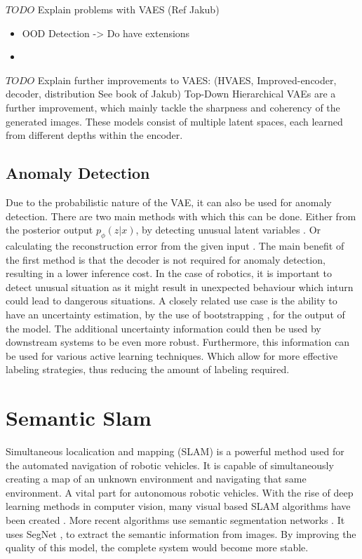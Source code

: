 $TODO$ Explain problems with VAES (Ref Jakub)
\begin{itemize}
    \item OOD Detection -> Do have extensions
    \item
\end{itemize}
$TODO$ Explain further improvements to VAES: (HVAES, Improved-{encoder, decoder, distribution} See book of Jakub)
Top-Down Hierarchical VAEs \cite{maaloe2019biva,NIPS2016_6ae07dcb,vahdat2020nvae} are a further improvement, which mainly tackle the sharpness and coherency of the generated images. These models consist of multiple latent spaces, each learned from different depths within the encoder.


\subsection{Anomaly Detection}
Due to the probabilistic nature of the VAE, it can also be used for anomaly detection. There are two main methods with which this can be done. Either from the posterior output $p_{\phi}(z|x)$, by detecting unusual latent variables \cite{marimont2020anomalydetectionlatentspace,angiulli2020improving,angiulli2023latent}. Or calculating the reconstruction error from the given input \cite{an2015variational, zhou2020unsupervisedanomalylocalizationusing, gouda2022unsupervised}. The main benefit of the first method is that the decoder is not required for anomaly detection, resulting in a lower inference cost. In the case of robotics, it is important to detect unusual situation as it might result in unexpected behaviour which inturn could lead to dangerous situations.
A closely related use case is the ability to have an uncertainty estimation, by the use of bootstrapping \cite{chen2018use,kohl2018probabilistic}, for the output of the model. The additional uncertainty information could then be used by downstream systems to be even more robust. Furthermore, this information can be used for various active learning \cite{hino2020active} techniques. Which allow for more effective labeling strategies, thus reducing the amount of labeling required.

\section{Semantic Slam}
Simultaneous localication and mapping (SLAM)\cite{chatila1985position} is a powerful method used for the automated navigation of robotic vehicles. It is capable of simultaneously creating a map of an unknown environment and navigating that same environment. A vital part for autonomous robotic vehicles. With the rise of deep learning methods in computer vision, many visual based SLAM algorithms have been created \cite{taketomi2017visual}. More recent algorithms use semantic segmentation networks \cite{yu2018ds}. It uses SegNet \cite{badri2017segnet}, to extract the semantic information from images. By improving the quality of this model, the complete system would become more stable.

